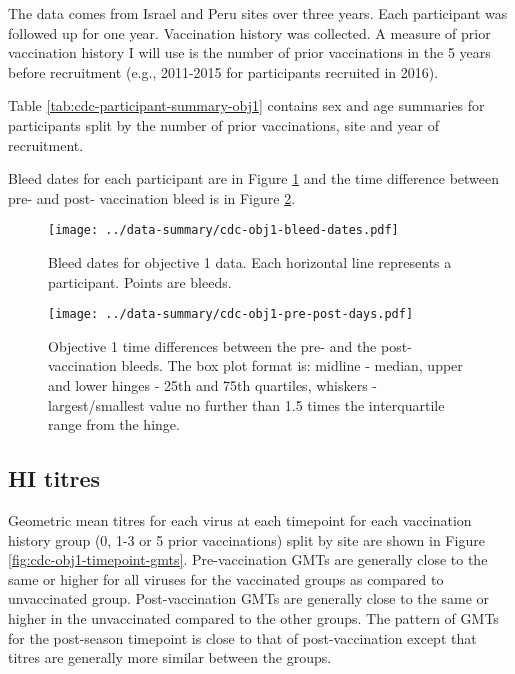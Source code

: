 \documentclass[12pt]{article}
\begin{document}
The data comes from Israel and Peru sites over three years. Each participant was followed up for one year. Vaccination history was collected. A measure of prior vaccination history I will use is the number of prior vaccinations in the 5 years before recruitment (e.g., 2011-2015 for participants recruited in 2016).

Table \ref{tab:cdc-participant-summary-obj1} contains sex and age summaries for participants split by the number of prior vaccinations, site and year of recruitment.



Bleed dates for each participant are in Figure \ref{fig:cdc-obj1-bleed-dates} and the time difference between pre- and post- vaccination bleed is in Figure \ref{fig:cdc-obj1-pre-post-days}.

\begin{figure}
	\texttt{[image: ../data-summary/cdc-obj1-bleed-dates.pdf]}
	\caption{Bleed dates for objective 1 data. Each horizontal line represents a participant. Points are bleeds.}
	\label{fig:cdc-obj1-bleed-dates}
\end{figure}



\begin{figure}
	\texttt{[image: ../data-summary/cdc-obj1-pre-post-days.pdf]}
	\caption{Objective 1 time differences between the pre- and the post-vaccination bleeds. The box plot format is: midline - median, upper and lower hinges - 25th and 75th quartiles, whiskers - largest/smallest value no further than 1.5 times the interquartile range from the hinge.}
	\label{fig:cdc-obj1-pre-post-days}
\end{figure}

\subsection{HI titres}

Geometric mean titres for each virus at each timepoint for each vaccination history group (0, 1-3 or 5 prior vaccinations) split by site are shown in Figure
\ref{fig:cdc-obj1-timepoint-gmts}.
Pre-vaccination GMTs are generally close to the same
or higher for all viruses for the vaccinated groups as compared to unvaccinated group.
Post-vaccination GMTs are generally close to the same or higher in the unvaccinated compared to the other groups. The pattern of GMTs for the post-season timepoint is close to that
of post-vaccination except that titres are generally more similar between the groups.
\end{document}
